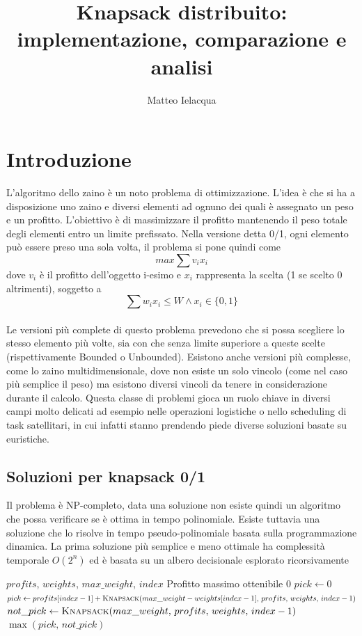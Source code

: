 \documentclass[11pt]{article}
\title{Knapsack distribuito: implementazione, comparazione e analisi}
\author{Matteo Ielacqua}
\begin{document}
\maketitle

\section{Introduzione}  
L'algoritmo dello zaino è un noto problema di ottimizzazione. L'idea è che si ha a disposizione uno zaino 
e diversi elementi ad ognuno dei quali è assegnato un peso e un profitto. L'obiettivo è di massimizzare il profitto mantenendo il peso
totale degli elementi entro un limite prefissato. Nella versione detta 0/1, ogni elemento può essere preso una sola volta,
il problema si pone quindi come  $$ max \sum v_ix_i $$
dove $v_i$ è il profitto dell'oggetto i-esimo e $x_i$ rappresenta la scelta (1 se scelto 0 altrimenti), soggetto a 
$$ \sum w_ix_i \leq W \land x_i \in \{0,1\} $$ 
\\
Le versioni più complete di questo problema prevedono che si possa scegliere lo stesso elemento più volte, sia con che senza limite superiore a queste scelte
(rispettivamente Bounded o Unbounded). Esistono anche versioni più complesse, come lo zaino multidimensionale, dove non esiste un solo vincolo 
(come nel caso più semplice il peso) ma esistono diversi vincoli da tenere in considerazione durante il calcolo. Questa classe di problemi gioca 
un ruolo chiave in diversi campi molto delicati ad esempio nelle operazioni logistiche o nello scheduling di task satellitari, in cui infatti 
stanno prendendo piede diverse soluzioni basate su euristiche.

\subsection{Soluzioni per knapsack 0/1}
Il problema è NP-completo, data una soluzione non esiste quindi un algoritmo che possa verificare se è ottima in tempo polinomiale.
Esiste tuttavia una soluzione che lo risolve in tempo pseudo-polinomiale basata sulla programmazione dinamica. 
La prima soluzione più semplice e meno ottimale ha complessità temporale $O(2^n)$ ed è basata su un albero decisionale esplorato ricorsivamente
\begin{algorithm}[H]
\caption{Knapsack 0/1 Ricorsivo}\label{alg:knapsack-rec}
\begin{algorithmic}
\Require $profits$, $weights$, $max\_weight$, $index$
\Ensure Profitto massimo ottenibile
    \State \Return $0$
\EndIf
\State $pick \gets 0$
    \State $pick \gets profits[index-1] + \Call{Knapsack}{max\_weight - weights[index-1],\, profits,\, weights,\, index-1}$
\EndIf
\State $not\_pick \gets \Call{Knapsack}{max\_weight,\, profits,\, weights,\, index-1}$
\State \Return $\max(pick,\, not\_pick)$
\end{algorithmic}
\end{algorithm}
\end{document}
